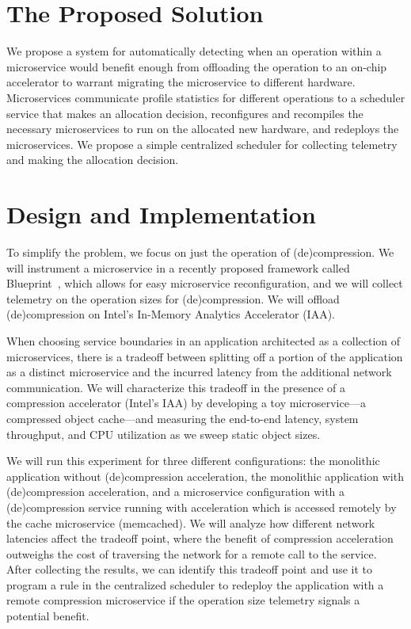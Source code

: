 \documentclass[letterpaper,twocolumn,10pt]{article}
\begin{document}
\section{The Proposed Solution}
We propose a system for automatically detecting when an operation within a microservice would benefit enough from offloading the operation to an on-chip accelerator to warrant migrating the microservice to different hardware.
Microservices communicate profile statistics for different operations to a scheduler service that makes an allocation decision, reconfigures and recompiles the necessary microservices to run on the allocated new hardware, and redeploys the microservices.
We propose a simple centralized scheduler for collecting telemetry and making the allocation decision.

\section{Design and Implementation}
To simplify the problem, we focus on just the operation of (de)compression.
We will instrument a microservice in a recently proposed framework called Blueprint~\cite{anand2023blueprint}, which allows for easy microservice reconfiguration, and we will collect telemetry on the operation sizes for (de)compression.
We will offload (de)compression on Intel's In-Memory Analytics Accelerator (IAA).

When choosing service boundaries in an application architected as a collection of microservices, there is a tradeoff between splitting off a portion of the application as a distinct microservice and the incurred latency from the additional network communication.
We will characterize this tradeoff in the presence of a compression accelerator (Intel's IAA) by developing a toy microservice---a compressed object cache---and measuring the end-to-end latency, system throughput, and CPU utilization as we sweep static object sizes.

We will run this experiment for three different configurations: the monolithic application without (de)compression acceleration, the monolithic application with (de)compression acceleration, and a microservice configuration with a (de)compression service running with acceleration which is accessed remotely by the cache microservice (memcached).
We will analyze how different network latencies affect the tradeoff point, where the benefit of compression acceleration outweighs the cost of traversing the network for a remote call to the service.
After collecting the results, we can identify this tradeoff point and use it to program a rule in the centralized scheduler to redeploy the application with a remote compression microservice if the operation size telemetry signals a potential benefit.
\end{document}
